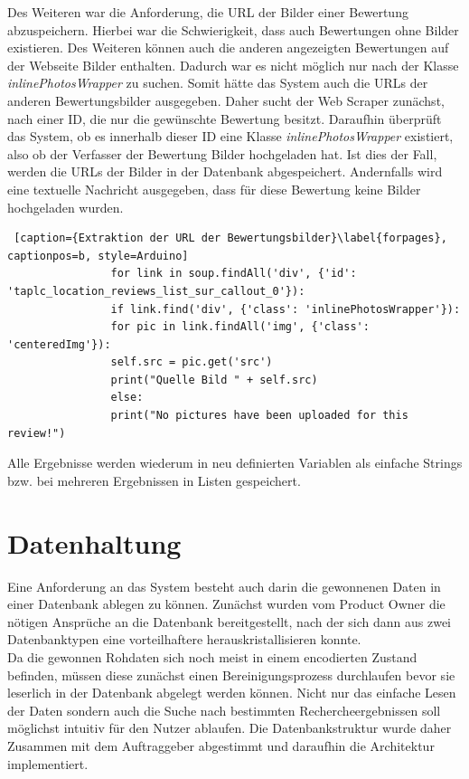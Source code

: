 \documentclass[a4paper,oneside,12pt]{report}
\begin{document}
				
				Des Weiteren war die Anforderung, die URL der Bilder einer Bewertung abzuspeichern. Hierbei war die Schwierigkeit, dass auch Bewertungen ohne Bilder existieren. Des Weiteren können auch die anderen angezeigten Bewertungen auf der Webseite Bilder enthalten. Dadurch war es nicht möglich nur nach der Klasse \textit{inlinePhotosWrapper} zu suchen. Somit hätte das System auch die URLs der anderen Bewertungsbilder ausgegeben.  
				Daher sucht der Web Scraper zunächst, nach einer ID, die nur die gewünschte Bewertung besitzt. Daraufhin überprüft das System, ob es innerhalb dieser ID eine Klasse \textit{inlinePhotosWrapper} existiert, also ob der Verfasser der Bewertung Bilder hochgeladen hat. Ist dies der Fall, werden die URLs der Bilder in der Datenbank abgespeichert. Andernfalls wird eine textuelle Nachricht ausgegeben, dass für diese Bewertung keine Bilder hochgeladen wurden.
				\\
				\begin{lstlisting} [caption={Extraktion der URL der Bewertungsbilder}\label{forpages}, captionpos=b, style=Arduino]
				for link in soup.findAll('div', {'id': 'taplc_location_reviews_list_sur_callout_0'}):
				if link.find('div', {'class': 'inlinePhotosWrapper'}):
				for pic in link.findAll('img', {'class': 'centeredImg'}):
				self.src = pic.get('src')
				print("Quelle Bild " + self.src)
				else:
				print("No pictures have been uploaded for this review!")
				\end{lstlisting}
				
				Alle Ergebnisse werden wiederum in neu definierten Variablen als einfache Strings bzw. bei mehreren Ergebnissen in Listen gespeichert. 
			
		\section[Datenhaltung - Johannes Knippel]{Datenhaltung}\label{datenhaltung}
			Eine Anforderung an das System besteht auch darin die gewonnenen Daten in einer Datenbank ablegen zu können. Zunächst wurden vom Product Owner die nötigen Ansprüche an die Datenbank bereitgestellt, nach der sich dann aus zwei Datenbanktypen eine vorteilhaftere herauskristallisieren konnte. 
			\\
			Da die gewonnen Rohdaten sich noch meist in einem encodierten Zustand befinden, müssen diese zunächst einen Bereinigungsprozess durchlaufen bevor sie leserlich in der Datenbank abgelegt werden können. Nicht nur das einfache Lesen der Daten sondern auch die Suche nach bestimmten Rechercheergebnissen soll möglichst intuitiv für den Nutzer ablaufen. Die Datenbankstruktur wurde daher Zusammen mit dem Auftraggeber abgestimmt und daraufhin die Architektur implementiert.
		
\end{document}

